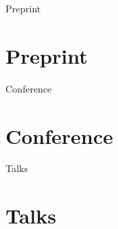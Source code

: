 \documentclass[a4paper,12pt]{article}
\title{\myTitle}
\author{\myName}
\date{\small(Updated: \today)}
\newcommand\myBib[1]{
\begin{btSect}{#1}
\section*{#1}
\btPrintAll
\end{btSect}}
\begin{document}
\maketitle



\myBib{Preprint}
\myBib{Conference}
\myBib{Talks}
\end{document}
